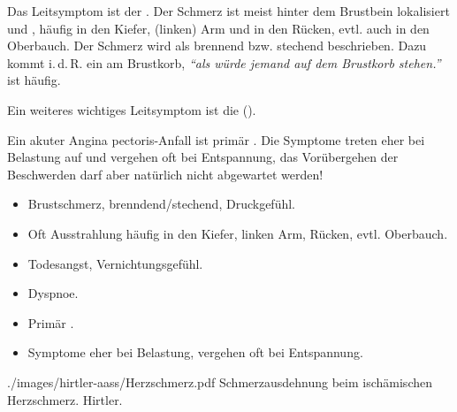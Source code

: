 {%
Das Leitsymptom ist der . Der Schmerz ist meist hinter dem Brustbein lokalisiert und
, häufig in den Kiefer, (linken) Arm und in den Rücken,
evtl. auch in den Oberbauch. Der Schmerz wird als brennend bzw. stechend beschrieben.
Dazu kommt i.\,d.\,R. ein  am Brustkorb, \emph{"`als würde jemand
auf dem Brustkorb stehen."'}  ist
häufig. 

Ein weiteres wichtiges Leitsymptom ist die 
().

Ein akuter Angina pectoris-Anfall ist primär . Die Symptome treten eher bei Belastung auf und
vergehen oft bei Entspannung, das Vorübergehen der Beschwerden darf aber
natürlich nicht abgewartet werden! 

}{
\begin{itemize}
  \item Brustschmerz, brenndend/stechend, Druckgefühl.
  \item Oft Ausstrahlung häufig in den Kiefer,
  linken Arm, Rücken, evtl. Oberbauch.
  \item Todesangst, Vernichtungsgefühl.
  \item Dyspnoe.
  \item Primär .
  \item Symptome eher bei Belastung, vergehen oft bei Entspannung.
\end{itemize}

}
{./images/hirtler-aass/Herzschmerz.pdf}
{Schmerzausdehnung beim ischämischen
Herzschmerz.}
{Hirtler.}





